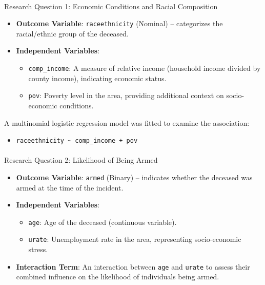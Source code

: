 \documentclass[
  letterpaper,
  DIV=11,
  numbers=noendperiod]{scrartcl}
\makeatletter
\let\oldparagraph\paragraph
\renewcommand{\paragraph}{
    \@ifstar
      \xxxParagraphStar
      \xxxParagraphNoStar
  }
\newcommand{\xxxParagraphStar}[1]{\oldparagraph*{#1}\mbox{}}
\newcommand{\xxxParagraphNoStar}[1]{\oldparagraph{#1}\mbox{}}
\providecommand{\tightlist}{%
  \setlength{\itemsep}{0pt}\setlength{\parskip}{0pt}}\usepackage{longtable,booktabs,array}
\makeatother
\begin{document}
\paragraph{Research Question 1: Economic Conditions and Racial
Composition}\label{research-question-1-economic-conditions-and-racial-composition}

\begin{itemize}
\tightlist
\item
  \textbf{Outcome Variable}: \texttt{raceethnicity} (Nominal) --
  categorizes the racial/ethnic group of the deceased.
\item
  \textbf{Independent Variables}:

  \begin{itemize}
  \tightlist
  \item
    \texttt{comp\_income}: A measure of relative income (household
    income divided by county income), indicating economic status.
  \item
    \texttt{pov}: Poverty level in the area, providing additional
    context on socio-economic conditions.
  \end{itemize}
\end{itemize}

A multinomial logistic regression model was fitted to examine the
association:

\begin{itemize}
\tightlist
\item
  \texttt{raceethnicity\ \textasciitilde{}\ comp\_income\ +\ pov}
\end{itemize}

\paragraph{Research Question 2: Likelihood of Being
Armed}\label{research-question-2-likelihood-of-being-armed}

\begin{itemize}
\tightlist
\item
  \textbf{Outcome Variable}: \texttt{armed} (Binary) -- indicates
  whether the deceased was armed at the time of the incident.
\item
  \textbf{Independent Variables}:

  \begin{itemize}
  \tightlist
  \item
    \texttt{age}: Age of the deceased (continuous variable).
  \item
    \texttt{urate}: Unemployment rate in the area, representing
    socio-economic stress.
  \end{itemize}
\item
  \textbf{Interaction Term}: An interaction between \texttt{age} and
  \texttt{urate} to assess their combined influence on the likelihood of
  individuals being armed.
\end{itemize}
\end{document}
